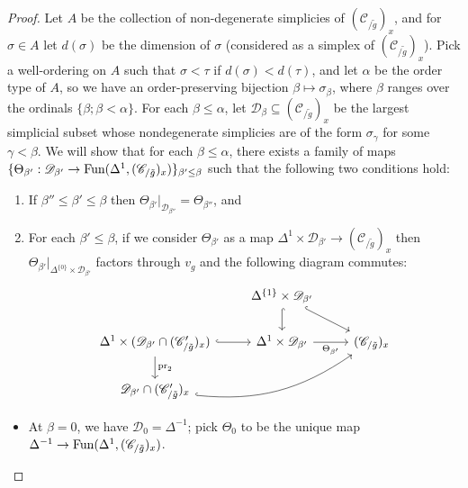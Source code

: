 \documentclass{tac}
\newcommand{\s}[1]{\mathscr{#1}}
\newcommand{\tx}[1]{\textnormal{#1}}
\begin{document}
\begin{proof}
Let $A$ be the collection of non-degenerate simplicies of $(\s{C}_{/ \tilde{g}})_x$, and for $\sigma \in A$ let $d(\sigma )$ be the dimension of $\sigma$ (considered as a simplex of  $(\s{C}_{/ \tilde{g}})_x$).  Pick a well-ordering on $A$ such that $\sigma <\tau$ if $d(\sigma) < d(\tau)$, and let $\alpha$ be the order type of $A$, so we have an order-preserving bijection $\beta \mapsto \sigma_\beta$, where $\beta$ ranges over the ordinals $\{\beta ; \beta <\alpha \}$.  For each $\beta\leq \alpha$, let $\s{D}_\beta \subseteq (\s{C}_{/ \tilde{g}})_x$ be the largest simplicial subset whose nondegenerate simplicies are of the form $\sigma_{\gamma}$ for some $\gamma < \beta$.  We will show that for each $\beta \leq \alpha$, there exists a family of maps $\{ \Theta_{\beta'} : \s{D}_{\beta'} \to \tx{Fun}(\Delta^1 , (\s{C}_{/ \tilde{g}})_x) \}_{\beta' \leq \beta}$ such that the following two conditions hold: 
\begin{enumerate}
\item If $\beta'' \leq \beta' \leq \beta$ then $\Theta_{\beta'} |_{\s{D}_{\beta''}} = \Theta_{\beta''}$, and \item For each $\beta' \leq \beta$, if we consider $\Theta_{\beta'}$ as a map $\Delta^1 \times \s{D}_{\beta'} \to (\s{C}_{/\tilde{g}})_x$ then $\Theta_{\beta'} |_{\Delta^{\{0\}} \times \s{D}_{\beta'}}$ factors through $v_g$ and the following diagram commutes:
\begin{equation}\label{cohnultrianglepropdiag1} \begin{tikzcd} &  \Delta^{\{1\}} \times \s{D}_{\beta'} \arrow[hook]{d} \arrow[hook]{dr} & \\
\Delta^1 \times ( \s{D}_{\beta'} \cap (\s{C}_{/\tilde{g}}')_x) \arrow[hook]{r} \arrow[]{d}{\tx{pr}_2} & \Delta^1 \times \s{D}_{\beta'} \arrow[]{r}[swap]{\Theta_{\beta'}} & (\s{C}_{/\tilde{g}})_x \\
\s{D}_{\beta'} \cap (\s{C}_{/\tilde{g}}')_x \arrow[hook, bend right=20]{urr} & &
\end{tikzcd}\end{equation}
\end{enumerate}
\begin{itemize}%
\item 
At $\beta =0$, we have $\s{D}_0 = \Delta^{-1}$; pick $\Theta_0$ to be the unique map $\Delta^{-1} \to \tx{Fun}(\Delta^1 , (\s{C}_{/ \tilde{g}})_x)$.  


\end{itemize}
\end{proof}
\end{document}
